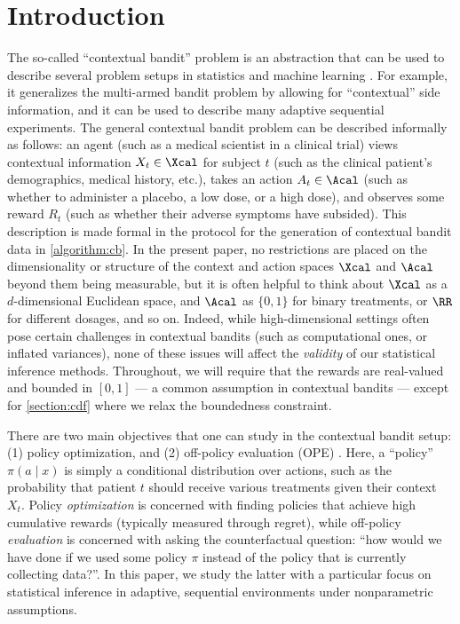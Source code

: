 \section{Introduction}\label{section:introduction}

The so-called ``contextual bandit'' problem is an abstraction that can be used to describe several problem setups in statistics and machine learning \citep{langford2007epoch,li2010contextual}. For example, it generalizes the multi-armed bandit problem by allowing for ``contextual'' side information, and it can be used to describe many adaptive sequential experiments. The general contextual bandit problem can be described informally as follows: an agent (such as a medical scientist in a clinical trial) views contextual information $X_t \in \Xcal$ for subject $t$ (such as the clinical patient's demographics, medical history, etc.), takes an action $A_t \in \Acal$ (such as whether to administer a placebo, a low dose, or a high dose), and observes some reward $R_t$ (such as whether their adverse symptoms have subsided). This description is made formal in the protocol for the generation of contextual bandit data in \cref{algorithm:cb}. In the present paper, no restrictions are placed on the dimensionality or structure of the context and action spaces $\Xcal$ and $\Acal$ beyond them being measurable, but it is often helpful to think about $\Xcal$ as a $d$-dimensional Euclidean space, and $\Acal$ as $\{0, 1\}$ for binary treatments, or $\RR$ for different dosages, and so on. Indeed, while high-dimensional settings often pose certain challenges in contextual bandits (such as computational ones, or inflated variances), none of these issues will affect the \emph{validity} of our statistical inference methods. Throughout, we will require that the rewards are real-valued and bounded in $[0, 1]$ --- a common assumption in contextual bandits \citep{thomas2015high,karampatziakis2021off} --- except for \cref{section:cdf} where we relax the boundedness constraint.

There are two main objectives that one can study in the contextual bandit setup: (1) policy optimization, and (2) off-policy evaluation (OPE) \citep{li2010contextual,langford2007epoch,dudik2011doubly,dudik2014doubly}. Here, a ``policy'' $\pi(a \mid x)$ is simply a conditional distribution over actions, such as the probability that patient $t$ should receive various treatments given their context $X_t$. Policy \emph{optimization} is concerned with finding policies that achieve high cumulative rewards (typically measured through regret), while off-policy \emph{evaluation} is concerned with asking the counterfactual question: ``how would we have done if we used some policy $\pi$ instead of the policy that is currently collecting data?''. In this paper, we study the latter with a particular focus on statistical inference in adaptive, sequential environments under nonparametric assumptions.


